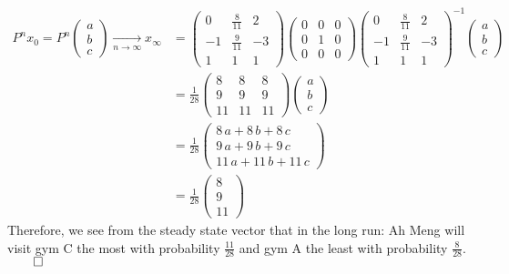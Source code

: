 \documentclass[12pt, a4paper]{article}
\begin{document}
\begin{enumerate}[Q\arabic*.]
\begin{enumerate}[(\alph*)]
\begin{align*}
          P^nx_0 = P^n\left(\begin{array}{c} a\\ b\\ c \end{array}\right) \xrightarrow[n\rightarrow\infty]{} x_{\infty} &= \left(\begin{array}{ccc} 0 & \frac{8}{11} & 2\\ -1 & \frac{9}{11} & -3\\ 1 & 1 & 1 \end{array}\right)\left(\begin{array}{ccc} 0 & 0 & 0\\ 0 & 1 & 0\\ 0 & 0 & 0 \end{array}\right)\left(\begin{array}{ccc} 0 & \frac{8}{11} & 2\\ -1 & \frac{9}{11} & -3\\ 1 & 1 & 1 \end{array}\right)^{-1}\left(\begin{array}{c} a\\ b\\ c \end{array}\right)\\
                                                                                                 &= \frac{1}{28}\left(\begin{array}{ccc} 8 & 8 & 8\\ 9 & 9 & 9\\ 11 & 11 & 11 \end{array}\right)\left(\begin{array}{c} a\\ b\\ c \end{array}\right)\\
                                                                                                 &= \frac{1}{28}\left(\begin{array}{c} 8\,a+8\,b+8\,c\\ 9\,a+9\,b+9\,c\\ 11\,a+11\,b+11\,c \end{array}\right)\\
                                                                                                 &= \frac{1}{28}\left(\begin{array}{c} 8\\ 9\\ 11 \end{array}\right)
        \end{align*}
        Therefore, we see from the steady state vector that in the long run: Ah Meng will visit gym C the most with probability $\displaystyle \frac{11}{28}$ and gym A the least with probability $\displaystyle \frac{8}{28}$. $\qed$
    \end{enumerate}


\end{enumerate}
\end{document}
